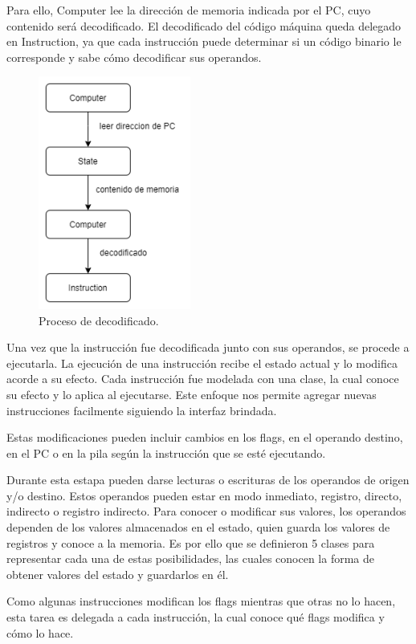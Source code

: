Para ello, Computer lee la dirección de memoria indicada por el PC, cuyo contenido será decodificado. 
El decodificado del código máquina queda delegado en Instruction, ya que cada instrucción puede determinar si un código binario le corresponde y sabe
cómo decodificar sus operandos.
\begin{figure}[H]
  \centering
  \includegraphics[width=5cm]{figuras/decodificado.png}
  \caption{Proceso de decodificado.}
\end{figure}

Una vez que la instrucción fue decodificada junto con sus operandos, se procede a ejecutarla. La ejecución de una instrucción recibe el estado actual y
lo modifica acorde a su efecto. Cada instrucción fue modelada con una clase, la cual conoce su efecto y lo aplica al ejecutarse. Este enfoque nos permite
agregar nuevas instrucciones facilmente siguiendo la interfaz brindada.

Estas modificaciones pueden incluir cambios en los flags, en el operando destino, en el PC o en la pila según la instrucción que se esté ejecutando.

Durante esta estapa pueden darse lecturas o escrituras de los operandos de origen y/o destino. Estos operandos pueden estar en modo inmediato, registro, directo,
indirecto o registro indirecto. Para conocer o modificar sus valores, los operandos dependen de los valores almacenados en el estado, quien guarda 
los valores de registros y conoce a la memoria. Es por ello que se definieron 5 clases para representar cada una de estas posibilidades, las cuales conocen
la forma de obtener valores del estado y guardarlos en él.

Como algunas instrucciones modifican los flags mientras que otras no lo hacen, esta tarea es delegada a cada instrucción, la cual conoce qué flags modifica
y cómo lo hace.

